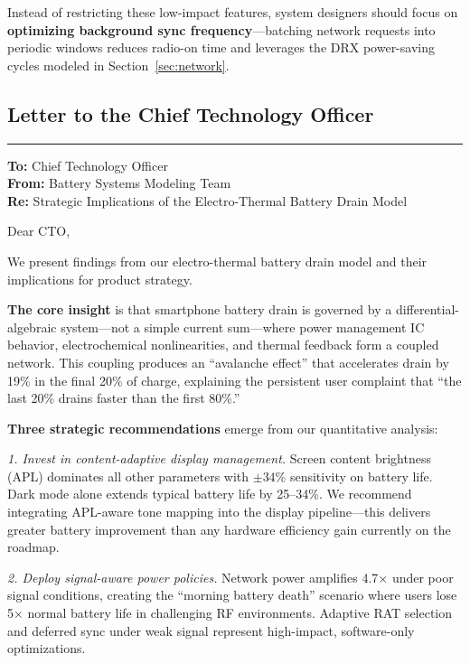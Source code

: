 \documentclass{mcmthesis}
\begin{document}
Instead of restricting these low-impact features, system designers should focus on \textbf{optimizing background sync frequency}---batching network requests into periodic windows reduces radio-on time and leverages the DRX power-saving cycles modeled in Section~\ref{sec:network}.

\subsection{Letter to the Chief Technology Officer}
\label{sec:executive_letter}

\bigskip
\noindent\rule{\linewidth}{0.4pt}

\medskip
\noindent
\textbf{To:} Chief Technology Officer \\
\textbf{From:} Battery Systems Modeling Team \\
\textbf{Re:} Strategic Implications of the Electro-Thermal Battery Drain Model

\medskip
Dear CTO,

We present findings from our electro-thermal battery drain model and their implications for product strategy.

\textbf{The core insight} is that smartphone battery drain is governed by a differential-algebraic system---not a simple current sum---where power management IC behavior, electrochemical nonlinearities, and thermal feedback form a coupled network. This coupling produces an ``avalanche effect'' that accelerates drain by 19\% in the final 20\% of charge, explaining the persistent user complaint that ``the last 20\% drains faster than the first 80\%.''

\textbf{Three strategic recommendations} emerge from our quantitative analysis:

\textit{1. Invest in content-adaptive display management.} Screen content brightness (APL) dominates all other parameters with $\pm$34\% sensitivity on battery life. Dark mode alone extends typical battery life by 25--34\%. We recommend integrating APL-aware tone mapping into the display pipeline---this delivers greater battery improvement than any hardware efficiency gain currently on the roadmap.

\textit{2. Deploy signal-aware power policies.} Network power amplifies 4.7$\times$ under poor signal conditions, creating the ``morning battery death'' scenario where users lose 5$\times$ normal battery life in challenging RF environments. Adaptive RAT selection and deferred sync under weak signal represent high-impact, software-only optimizations.
\end{document}

